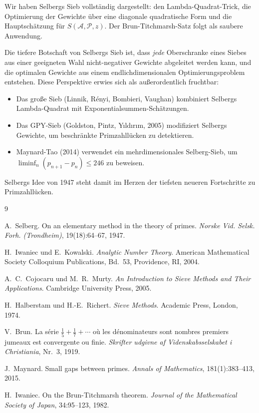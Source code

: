 \documentclass[12pt,a4paper]{amsart}
\theoremstyle{definition}
\begin{document}
Wir haben Selbergs Sieb vollständig dargestellt: den Lambda-Quadrat-Trick,
die Optimierung der Gewichte über eine diagonale quadratische Form und die
Hauptschätzung für $S(\mathcal{A},\mathcal{P},z)$.  Der Brun-Titchmarsh-Satz
folgt als saubere Anwendung.

Die tiefere Botschaft von Selbergs Sieb ist, dass \emph{jede} Oberschranke eines
Siebes aus einer geeigneten Wahl nicht-negativer Gewichte abgeleitet werden kann,
und die optimalen Gewichte aus einem endlichdimensionalen Optimierungsproblem
entstehen.  Diese Perspektive erwies sich als außerordentlich fruchtbar:
\begin{itemize}
  \item Das große Sieb (Linnik, Rényi, Bombieri, Vaughan) kombiniert Selbergs
    Lambda-Quadrat mit Exponentialsummen-Schätzungen.
  \item Das GPY-Sieb (Goldston, Pintz, Y{\i}ld{\i}r{\i}m, 2005) modifiziert
    Selbergs Gewichte, um beschränkte Primzahllücken zu detektieren.
  \item Maynard-Tao (2014) verwendet ein mehrdimensionales Selberg-Sieb, um
    $\liminf_n (p_{n+1} - p_n) \leq 246$ zu beweisen.
\end{itemize}

Selbergs Idee von 1947 steht damit im Herzen der tiefsten neueren Fortschritte
zu Primzahllücken.

\begin{thebibliography}{9}

A.~Selberg.
\newblock On an elementary method in the theory of primes.
\newblock \emph{Norske Vid. Selsk. Forh. (Trondheim)}, 19(18):64--67, 1947.

H.~Iwaniec und E.~Kowalski.
\newblock \emph{Analytic Number Theory}.
\newblock American Mathematical Society Colloquium Publications, Bd.~53,
  Providence, RI, 2004.

A.~C.~Cojocaru und M.~R.~Murty.
\newblock \emph{An Introduction to Sieve Methods and Their Applications}.
\newblock Cambridge University Press, 2005.

H.~Halberstam und H.-E.~Richert.
\newblock \emph{Sieve Methods}.
\newblock Academic Press, London, 1974.

V.~Brun.
\newblock La s{\'e}rie $\frac{1}{5}+\frac{1}{7}+\cdots$ o\`u les d{\'e}nominateurs
  sont nombres premiers jumeaux est convergente ou finie.
\newblock \emph{Skrifter udgivne af Videnskabsselskabet i Christiania}, Nr.~3, 1919.

J.~Maynard.
\newblock Small gaps between primes.
\newblock \emph{Annals of Mathematics}, 181(1):383--413, 2015.

H.~Iwaniec.
\newblock On the Brun-Titchmarsh theorem.
\newblock \emph{Journal of the Mathematical Society of Japan}, 34:95--123, 1982.

\end{thebibliography}
\end{document}
